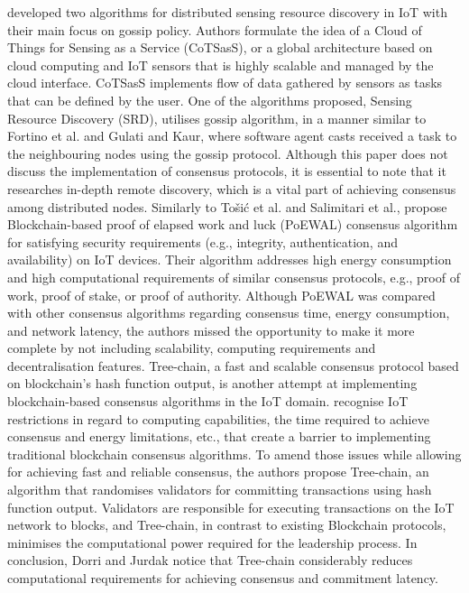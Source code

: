 \documentclass[oneside,12pt]{book}
\begin{document}
\cite{7417252} developed two algorithms for distributed sensing resource discovery in IoT with their main focus on gossip policy. Authors formulate the idea of a Cloud of Things for Sensing as a Service (CoTSasS), or a global architecture based on cloud computing and IoT sensors that is highly scalable and managed by the cloud interface. CoTSasS implements flow of data gathered by sensors as tasks that can be defined by the user. One of the algorithms proposed, Sensing Resource Discovery (SRD), utilises gossip algorithm, in a manner similar to Fortino et al. and Gulati and Kaur, where software agent casts received a task to the neighbouring nodes using the gossip protocol. Although this paper does not discuss the implementation of consensus protocols, it is essential to note that it researches in-depth remote discovery, which is a vital part of achieving consensus among distributed nodes.\smallskip \newline
Similarly to To{\v{s}}i{\'{c}} et al. and Salimitari et al., \cite{RAGHAV2020101291} propose Blockchain-based proof of elapsed work and luck (PoEWAL) consensus algorithm for satisfying security requirements (e.g., integrity, authentication, and availability) on IoT devices. Their algorithm addresses high energy consumption and high computational requirements of similar consensus protocols, e.g., proof of work, proof of stake, or proof of authority. Although PoEWAL was compared with other consensus algorithms regarding consensus time, energy consumption, and network latency, the authors missed the opportunity to make it more complete by not including scalability, computing requirements and decentralisation features.\smallskip \newline
Tree-chain, a fast and scalable consensus protocol based on blockchain’s hash function output, is another attempt at implementing blockchain-based consensus algorithms in the IoT domain. \cite{Tree-Chain} recognise IoT restrictions in regard to computing capabilities, the time required to achieve consensus and energy limitations, etc., that create a barrier to implementing traditional blockchain consensus algorithms. To amend those issues while allowing for achieving fast and reliable consensus, the authors propose Tree-chain, an algorithm that randomises validators for committing transactions using hash function output. Validators are responsible for executing transactions on the IoT network to blocks, and Tree-chain, in contrast to existing Blockchain protocols, minimises the computational power required for the leadership process. In conclusion, Dorri and Jurdak notice that Tree-chain considerably reduces computational requirements for achieving consensus and commitment latency.\smallskip \newline
\end{document}
